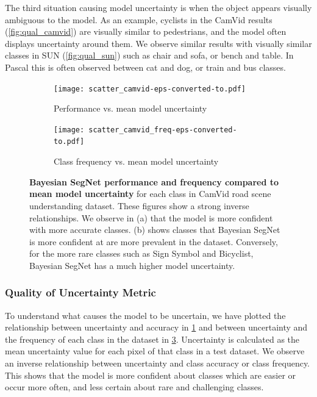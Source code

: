 The third situation causing model uncertainty is when the object appears visually ambiguous to the model. As an example, cyclists in the CamVid results (\cref{fig:qual_camvid}) are visually similar to pedestrians, and the model often displays uncertainty around them. We observe similar results with visually similar classes in SUN (\cref{fig:qual_sun}) such as chair and sofa, or bench and table. In Pascal this is often observed between cat and dog, or train and bus classes.

\begin{figure}[t]
    \centering
    \begin{subfigure}[t]{0.45\linewidth}
        \centering
        \texttt{[image: scatter\_camvid-eps-converted-to.pdf]}
        \label{fig:unc_acc2}
        \caption{Performance vs. mean model uncertainty}
    \end{subfigure}
    \begin{subfigure}[t]{0.45\linewidth}
        \centering
        \texttt{[image: scatter\_camvid\_freq-eps-converted-to.pdf]}
        \label{fig:unc_freq2}
        \caption{Class frequency vs. mean model uncertainty}
    \end{subfigure}
	\caption[Analysis of Bayesian SegNet's model uncertainty.]{\textbf{Bayesian SegNet performance and frequency compared to mean model uncertainty} for each class in CamVid road scene understanding dataset. These figures show a strong inverse relationships. We observe in (a) that the model is more confident with more accurate classes. (b) shows classes that Bayesian SegNet is more confident at are more prevalent in the dataset. Conversely, for the more rare classes such as Sign Symbol and Bicyclist, Bayesian SegNet has a much higher model uncertainty.}
\end{figure}

\subsubsection{Quality of Uncertainty Metric}

To understand what causes the model to be uncertain, we have plotted the relationship between uncertainty and accuracy in \cref{fig:unc_acc2} and between uncertainty and the frequency of each class in the dataset in \cref{fig:unc_freq2}. Uncertainty is calculated as the mean uncertainty value for each pixel of that class in a test dataset. We observe an inverse relationship between uncertainty and class accuracy or class frequency. This shows that the model is more confident about classes which are easier or occur more often, and less certain about rare and challenging classes.

